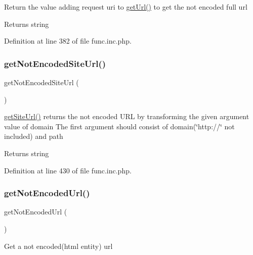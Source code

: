 Return the value adding request uri to \hyperlink{func_8inc_8php_accd14bda49a1044b4d8dd93f020f11ee}{get\+Url()} to get the not encoded full url

\begin{DoxyReturn}{Returns}
string 
\end{DoxyReturn}


Definition at line 382 of file func.\+inc.\+php.

\mbox{\label{func_8inc_8php_aa09cef59156d4afaeee54a675605f95d}} 
\subsubsection{\texorpdfstring{get\+Not\+Encoded\+Site\+Url()}{getNotEncodedSiteUrl()}}
{\footnotesize\ttfamily get\+Not\+Encoded\+Site\+Url (\begin{DoxyParamCaption}{ }\end{DoxyParamCaption})}

\hyperlink{func_8inc_8php_a2d80ea9652d1586d5dcd03d022150f73}{get\+Site\+Url()} returns the not encoded U\+RL by transforming the given argument value of domain The first argument should consist of domain(\char`\"{}http\+://\char`\"{} not included) and path

\begin{DoxyReturn}{Returns}
string 
\end{DoxyReturn}


Definition at line 430 of file func.\+inc.\+php.

\mbox{\label{func_8inc_8php_aa73dbeb07c5bcac26c24fe4c6b05d8d2}} 
\subsubsection{\texorpdfstring{get\+Not\+Encoded\+Url()}{getNotEncodedUrl()}}
{\footnotesize\ttfamily get\+Not\+Encoded\+Url (\begin{DoxyParamCaption}{ }\end{DoxyParamCaption})}

Get a not encoded(html entity) url


